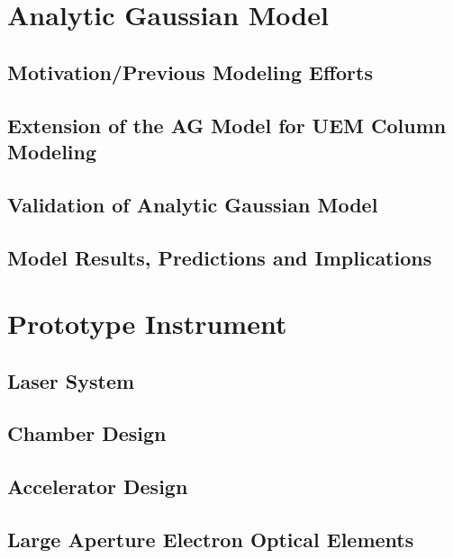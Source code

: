 \documentclass{uicthesi}
\begin{document}
\chapter{Analytic Gaussian Model}

\section{Motivation/Previous Modeling Efforts}



\section{Extension of the AG Model for UEM Column Modeling}





\section{Validation of Analytic Gaussian Model}

\section{Model Results, Predictions and Implications}

\chapter{Prototype Instrument}

\section{Laser System}

\section{Chamber Design}

\section{Accelerator Design}

\section{Large Aperture Electron Optical Elements}
\end{document}
